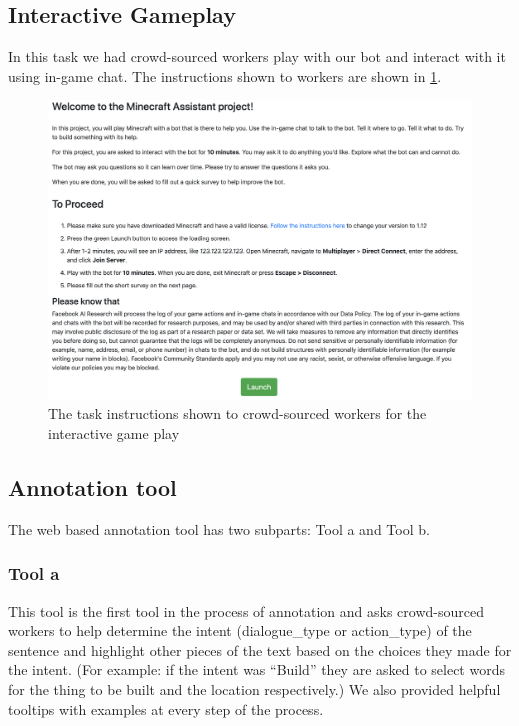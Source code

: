 \subsection{Interactive Gameplay}
\label{sec:appen}
In this task we had crowd-sourced workers play with our bot and interact with it using in-game chat. 
The instructions shown to workers are shown in \ref{fig:appen}. 
\begin{figure}
	\includegraphics[width=\linewidth ]{figures/appen.png}
	\caption{The task instructions shown to crowd-sourced workers for the interactive game play\label{fig:appen}}
\end{figure}

\subsection{Annotation tool}
\label{sec:anntn}
The web based annotation tool has two subparts: Tool a and Tool b.
\subsubsection{Tool a}
This tool is the first tool in the process of annotation and asks crowd-sourced workers to help determine the intent (dialogue\_type or action\_type) of the sentence and highlight other pieces of the text based on the choices they made for the intent. (For example: if the intent was ``Build'' they are asked to select words for the thing to be built  and the location respectively.)
We also provided helpful tooltips with examples at every step of the process.

